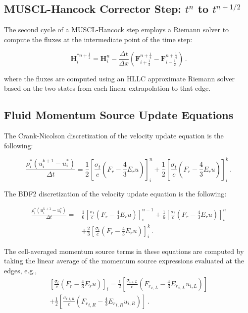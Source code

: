 \documentclass[preprint,12pt]{elsarticle}
\newcommand{\pep}{\, .}
\newcommand{\lequ}[1]{\label{eq:#1}}
\newcommand{\half}{\frac{1}{2}}
\newcommand{\fourth}{\frac{1}{4}}
\newcommand{\sixth}{\frac{1}{6}}
\newcommand{\E}{{E_r}}
\newcommand{\F}{{F_r}}
\renewcommand{\H}{\mathbf{H}}
\newcommand{\Flux}{\mathbf{F}}
\newcommand{\dt}{\Delta t}
\newcommand{\dx}{\Delta x}
\newcommand{\iL}{_{i,L}}
\newcommand{\iR}{_{i,R}}
\newcommand{\momentumSource}{
   \left[\frac{\sigma_{t}}{c}\left(\F-\frac{4}{3}\E u\right)\right]
}
\newcommand{\momentumUpdateCN}[4]{
\begin{equation}
  \frac{\rho^*#3\left(u^{k+1}#3-u^*#3\right)}{#2\dt} = 
   \half\momentumSource^{#1}#3
  +\half\momentumSource^k#3
  \pep
#4
\end{equation}
}
\newcommand{\momentumUpdateBDFTwo}[5]{
\begin{equation}\begin{split}
  \frac{\rho^*#4\left(u^{k+1}#4-u^*#4\right)}{#3\dt} =  
  & \sixth\momentumSource^{#1}#4
   +\sixth\momentumSource^{#2}#4\\
  &+\frac{2}{3}\momentumSource^k#4
  \pep
#5
\end{split}\end{equation}
}
\newcommand{\hydroCorrector}[5]{
\begin{equation}#5
  \H_i^{#3} = \H_i^{#1} - \frac{#4\dt}{\dx}
  \left(\Flux_{i+\half}^{#2} - \Flux_{i-\half}^{#2}\right) \pep
\end{equation}
}
\begin{document}
\subsection{MUSCL-Hancock Corrector Step: $t^n$ to $t^{n+1/2}$}

The second cycle of a MUSCL-Hancock step employs a Riemann solver
to compute the fluxes at the intermediate point of the time step:
\hydroCorrector{n}{n+\fourth}{*n+\half}{}{\label{eq:muscl_corrector}}
where the fluxes are computed using an HLLC approximate Riemann solver~\cite{toro}
based on the two states from each linear extrapolation to that edge.

\subsection{Fluid Momentum Source Update Equations}
The Crank-Nicolson discretization of the velocity update equation is the
following:
\momentumUpdateCN{n}{}{_i}{\lequ{hydromCNfull}}
The BDF2 discretization of the velocity update equation is the
following:
\momentumUpdateBDFTwo{n-1}{n}{}{_i}{\lequ{hydromBDF2full}}
The cell-averaged momentum source terms in these equations are computed by taking the linear
average of the momentum source expressions evaluated at the edges, e.g., 
\begin{multline}
   \left[\frac{\sigma_t}{c}\left(\F - \frac{4}{3}\E u\right)\right]_i =
   \half\left[\frac{\sigma_{t,i,L}}{c}\left(\F\iL - \frac{4}{3}\E\iL u\iL\right)\right]\\
   + \half\left[\frac{\sigma_{t,i,R}}{c}\left(\F\iR - \frac{4}{3}\E\iR u\iR\right)\right]
   \pep
\end{multline}

\end{document}
